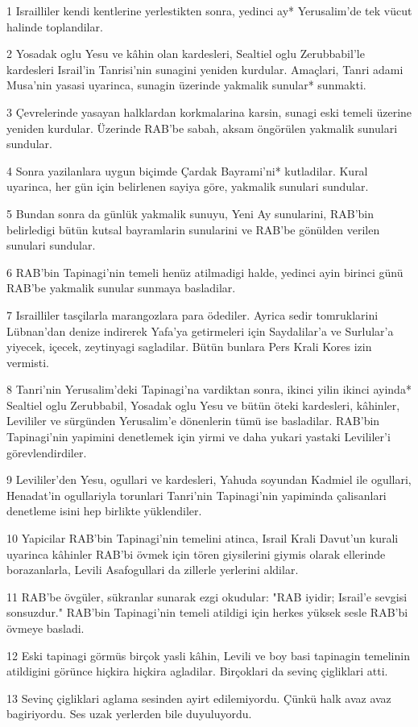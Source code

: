 \par 1 Israilliler kendi kentlerine yerlestikten sonra, yedinci ay* Yerusalim'de tek vücut halinde toplandilar.
\par 2 Yosadak oglu Yesu ve kâhin olan kardesleri, Sealtiel oglu Zerubbabil'le kardesleri Israil'in Tanrisi'nin sunagini yeniden kurdular. Amaçlari, Tanri adami Musa'nin yasasi uyarinca, sunagin üzerinde yakmalik sunular* sunmakti.
\par 3 Çevrelerinde yasayan halklardan korkmalarina karsin, sunagi eski temeli üzerine yeniden kurdular. Üzerinde RAB'be sabah, aksam öngörülen yakmalik sunulari sundular.
\par 4 Sonra yazilanlara uygun biçimde Çardak Bayrami'ni* kutladilar. Kural uyarinca, her gün için belirlenen sayiya göre, yakmalik sunulari sundular.
\par 5 Bundan sonra da günlük yakmalik sunuyu, Yeni Ay sunularini, RAB'bin belirledigi bütün kutsal bayramlarin sunularini ve RAB'be gönülden verilen sunulari sundular.
\par 6 RAB'bin Tapinagi'nin temeli henüz atilmadigi halde, yedinci ayin birinci günü RAB'be yakmalik sunular sunmaya basladilar.
\par 7 Israilliler tasçilarla marangozlara para ödediler. Ayrica sedir tomruklarini Lübnan'dan denize indirerek Yafa'ya getirmeleri için Saydalilar'a ve Surlular'a yiyecek, içecek, zeytinyagi sagladilar. Bütün bunlara Pers Krali Kores izin vermisti.
\par 8 Tanri'nin Yerusalim'deki Tapinagi'na vardiktan sonra, ikinci yilin ikinci ayinda* Sealtiel oglu Zerubbabil, Yosadak oglu Yesu ve bütün öteki kardesleri, kâhinler, Levililer ve sürgünden Yerusalim'e dönenlerin tümü ise basladilar. RAB'bin Tapinagi'nin yapimini denetlemek için yirmi ve daha yukari yastaki Levililer'i görevlendirdiler.
\par 9 Levililer'den Yesu, ogullari ve kardesleri, Yahuda soyundan Kadmiel ile ogullari, Henadat'in ogullariyla torunlari Tanri'nin Tapinagi'nin yapiminda çalisanlari denetleme isini hep birlikte yüklendiler.
\par 10 Yapicilar RAB'bin Tapinagi'nin temelini atinca, Israil Krali Davut'un kurali uyarinca kâhinler RAB'bi övmek için tören giysilerini giymis olarak ellerinde borazanlarla, Levili Asafogullari da zillerle yerlerini aldilar.
\par 11 RAB'be övgüler, sükranlar sunarak ezgi okudular: "RAB iyidir; Israil'e sevgisi sonsuzdur." RAB'bin Tapinagi'nin temeli atildigi için herkes yüksek sesle RAB'bi övmeye basladi.
\par 12 Eski tapinagi görmüs birçok yasli kâhin, Levili ve boy basi tapinagin temelinin atildigini görünce hiçkira hiçkira agladilar. Birçoklari da sevinç çigliklari atti.
\par 13 Sevinç çigliklari aglama sesinden ayirt edilemiyordu. Çünkü halk avaz avaz bagiriyordu. Ses uzak yerlerden bile duyuluyordu.


